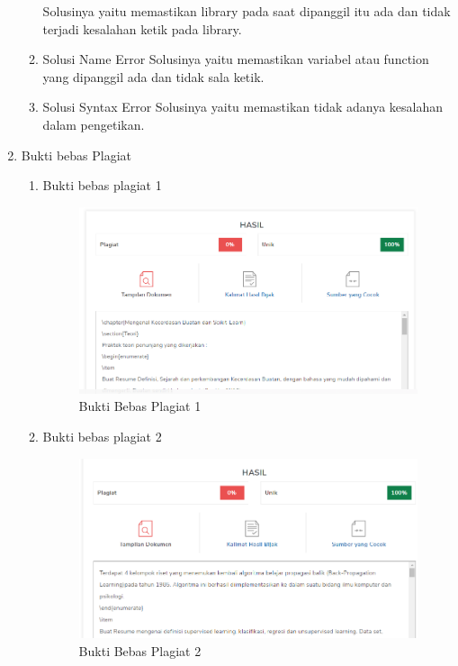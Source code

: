 \begin{enumerate}
\begin{enumerate}
\hfill\break
Solusinya yaitu memastikan library pada saat dipanggil itu ada dan tidak terjadi kesalahan ketik pada library.
\item Solusi Name Error 
\hfill\break
Solusinya yaitu memastikan variabel atau function yang dipanggil ada dan tidak sala ketik.
\item Solusi Syntax Error
\hfill\break
Solusinya yaitu memastikan tidak adanya kesalahan dalam pengetikan.
\end{enumerate}
\item Bukti bebas Plagiat
\begin{enumerate}
\item Bukti bebas plagiat 1
\begin{figure}[H]
	\includegraphics[width=1\textwidth]{figures/1184065/bukti1.png}
	\centering
	\caption{Bukti Bebas Plagiat 1}
	\end{figure}
	\item Bukti bebas plagiat 2
	\begin{figure}[H]
	\includegraphics[width=1\textwidth]{figures/1184065/bukti2.png}
	\centering
	\caption{Bukti Bebas Plagiat 2}
	\end{figure}
\end{enumerate}

\end{enumerate}

